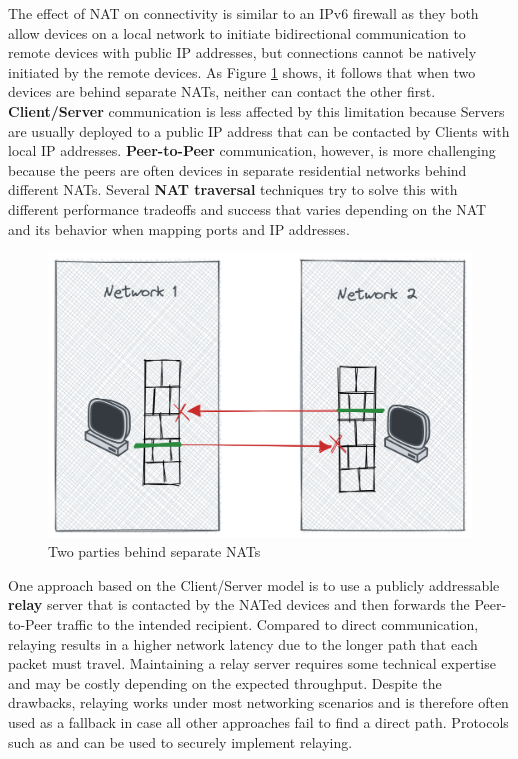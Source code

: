 The effect of NAT on connectivity is similar to an IPv6 firewall as they
both allow devices on a local network to initiate bidirectional
communication to remote devices with public IP addresses, but
connections cannot be natively initiated by the remote devices. As
Figure \ref{nat-intro} shows, it follows that when two devices are
behind separate NATs, neither can contact the other first.
\textbf{Client/Server} communication is less affected by this limitation
because Servers are usually deployed to a public IP address that can be
contacted by Clients with local IP addresses. \textbf{Peer-to-Peer}
communication, however, is more challenging because the peers are often
devices in separate residential networks behind different NATs. Several
\textbf{NAT traversal} techniques try to solve this with different
performance tradeoffs and success that varies depending on the NAT
\autocite{natBehaviorRFC} and its behavior when mapping ports and IP
addresses.

\begin{figure}
\centering
\includegraphics[width=\textwidth,height=0.25\textheight]{thesis/../figures/nat-intro.png}
\caption{Two parties behind separate NATs\label{nat-intro}}
\end{figure}

One approach based on the Client/Server model is to use a publicly
addressable \textbf{relay} server that is contacted by the NATed devices
and then forwards the Peer-to-Peer traffic to the intended recipient.
Compared to direct communication, relaying results in a higher network
latency due to the longer path that each packet must travel. Maintaining
a relay server requires some technical expertise and may be costly
depending on the expected throughput. Despite the drawbacks, relaying
works under most networking scenarios and is therefore often used as a
fallback in case all other approaches fail to find a direct path.
Protocols such as  \autocite{turnRFC} and
 \autocite{derpDocs} can be used to securely implement
relaying.

